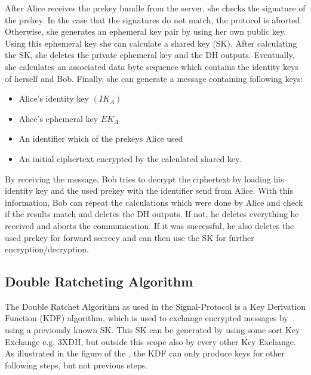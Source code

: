 \documentclass[12pt,oneside,a4paper,parskip]{scrbook}
\begin{document}
After Alice receives the prekey bundle from the server, she checks the signature of the prekey. In the case that the signatures do not match, the protocol is aborted.
Otherwise, she generates an ephemeral key pair by using her own public key. Using this ephemeral key she can calculate a shared key (SK). After calculating the SK, she deletes the private ephemeral key and the DH outputs. Eventually, she calculates an associated data byte sequence which contains the identity keys of herself and Bob.
Finally, she can generate a message containing following keys:
\begin{itemize}
  \item Alice's identity key $    (IK_{A})  $
  \item Alice's ephemeral key $   {EK_{A}}  $
  \item An identifier which of the prekeys Alice used
  \item An initial ciphertext encrypted by the calculated shared key.
\end{itemize}

By receiving the message, Bob tries to decrypt the ciphertext by loading his identity key and the used prekey with the identifier send from Alice. With this information, Bob can repeat the calculations which were done by Alice and check if the results match and deletes the DH outputs. If not, he deletes everything he received and aborts the communication. If it was successful, he also deletes the used prekey for forward secrecy and can then use the SK for further encryption/decryption. 
\parencite{marlinspike_x3dh_2016}

\subsection{Double Ratcheting Algorithm}

The Double Ratchet Algorithm as used in the Signal-Protocol is a Key Derivation Function (KDF) algorithm, which is used to exchange encrypted messages by using a previously known SK. This SK can be generated by using some sort Key Exchange e.g. 3XDH, but outside this scope also by every other Key Exchange. As illustrated in the figure of the , the KDF can only produce keys for other following steps, but not previous steps.
\end{document}
